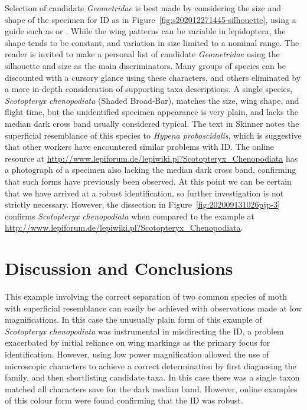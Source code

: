 \documentclass[]{article}
\begin{document}
Selection of candidate \textit{Geometridae} is best made by considering the size and shape of the specimen for ID as in Figure~\ref{fig:s202012271445-silhouette}, using  a guide such as \citet{Skinner1984} or \citet{Waring2018}.  While the wing patterns can be variable in lepidoptera, the shape tends to be constant, and variation in size limited to a nominal range.  The reader is invited to make a personal list of candidate \textit{Geometridae} using the silhouette and size as the main discriminators.  Many groups of species can be discounted with a cursory glance using these characters, and others eliminated by a more in-depth consideration of supporting taxa descriptions.
A single species, \textit{Scotopteryx chenopodiata} (Shaded Broad-Bar),  matches the size,  wing shape, and flight time,  but the unidentified specimen appearance is very plain,  and lacks the median dark cross band usually considered typical. The text in Skinner notes the superficial resemblance of this species to \textit{Hypena proboscidalis}, which is suggestive that other workers have encountered similar problems with ID. The online resource at \url{http://www.lepiforum.de/lepiwiki.pl?Scotopteryx_Chenopodiata} has a photograph of a specimen also lacking the median dark cross band, confirming that such forms have previously been observed. At this point we can be certain that we have arrived at a robust identification, so further investigation is not strictly necessary. However, 
the dissection in Figure~\ref{fig:202009131026pjp-3}  confirms \textit{Scotopteryx chenopodiata} when compared to the example at \url{http://www.lepiforum.de/lepiwiki.pl?Scotopteryx_Chenopodiata}.

\section*{Discussion and Conclusions}
This example involving the correct separation of two common species of moth with superficial resemblance can easily be achieved with observations made at low magnifications. In this case the unusually plain form of this example of \textit{Scotopteryx chenopodiata} was instrumental in misdirecting the ID, a problem exacerbated by initial reliance on wing markings as the primary focus for identification. However, using low power magnification allowed the use of microscopic characters to achieve a correct determination by first diagnosing the family, and then shortlisting candidate taxa. In this case there was a single taxon  matched all characters save for the dark median band. However, online examples of this colour form were found confirming that the ID was robust.
\end{document}
